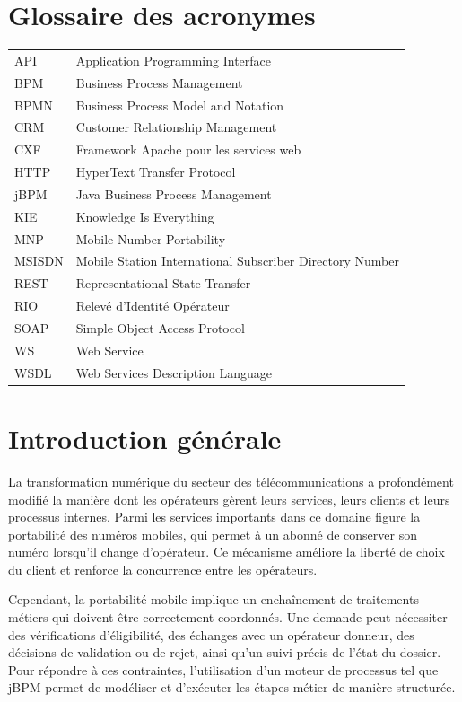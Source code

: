 \documentclass[12pt,a4paper]{report}
\begin{document}
\chapter*{Glossaire des acronymes}
\begin{longtable}{p{3cm}p{11cm}}
    API & Application Programming Interface\\
    BPM & Business Process Management\\
    BPMN & Business Process Model and Notation\\
    CRM & Customer Relationship Management\\
    CXF & Framework Apache pour les services web\\
    HTTP & HyperText Transfer Protocol\\
    jBPM & Java Business Process Management\\
    KIE & Knowledge Is Everything\\
    MNP & Mobile Number Portability\\
    MSISDN & Mobile Station International Subscriber Directory Number\\
    REST & Representational State Transfer\\
    RIO & Relevé d'Identité Opérateur\\
    SOAP & Simple Object Access Protocol\\
    WS & Web Service\\
    WSDL & Web Services Description Language\\
\end{longtable}

\clearpage
{}

\chapter*{Introduction générale}
La transformation numérique du secteur des télécommunications a profondément modifié la manière dont les opérateurs gèrent leurs services, leurs clients et leurs processus internes. Parmi les services importants dans ce domaine figure la portabilité des numéros mobiles, qui permet à un abonné de conserver son numéro lorsqu'il change d'opérateur. Ce mécanisme améliore la liberté de choix du client et renforce la concurrence entre les opérateurs.

Cependant, la portabilité mobile implique un enchaînement de traitements métiers qui doivent être correctement coordonnés. Une demande peut nécessiter des vérifications d'éligibilité, des échanges avec un opérateur donneur, des décisions de validation ou de rejet, ainsi qu'un suivi précis de l'état du dossier. Pour répondre à ces contraintes, l'utilisation d'un moteur de processus tel que jBPM permet de modéliser et d'exécuter les étapes métier de manière structurée.
\end{document}
